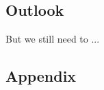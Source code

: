 \documentclass[%
    ]{\PathToTumTemplate/thesis/tum_thesis}
\begin{document}
\section{Outlook}\label{sec:outlook}

But we still need to ...






\begin{appendix}
\chapter{Appendix}




\end{appendix}




\ifoptionbiblatex
    \printbibliography[heading=bibintoc]              %
\else
\fi
\end{document}
